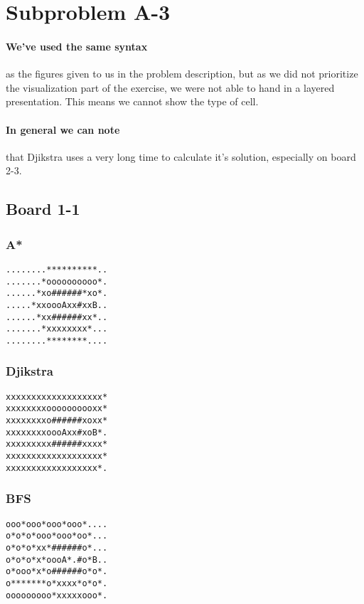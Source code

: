 \documentclass[11pt,a4paper]{article}
\begin{document}
\section*{Subproblem A-3}
\paragraph{We've used the same syntax} as the figures given to us in the problem description, but as we did not prioritize the visualization part of the exercise, we were not able to hand in a layered presentation. This means we cannot show the type of cell.

\paragraph{In general we can note} that Djikstra uses a very long time to calculate it's solution, especially on board 2-3.

\subsection*{Board 1-1}
\subsubsection*{A*}
\begin{lstlisting}
........**********..
.......*oooooooooo*.
......*xo######*xo*.
.....*xxoooAxx#xxB..
......*xx######xx*..
.......*xxxxxxxx*...
........********....
\end{lstlisting}

\subsubsection*{Djikstra}
\begin{lstlisting}
xxxxxxxxxxxxxxxxxxx*
xxxxxxxxoooooooooxx*
xxxxxxxxo######xoxx*
xxxxxxxxoooAxx#xoB*.
xxxxxxxxx######xxxx*
xxxxxxxxxxxxxxxxxxx*
xxxxxxxxxxxxxxxxxx*.
\end{lstlisting}



\subsubsection*{BFS}
\begin{lstlisting}
ooo*ooo*ooo*ooo*....
o*o*o*ooo*ooo*oo*...
o*o*o*xx*######o*...
o*o*o*x*oooA*.#o*B..
o*ooo*x*o######o*o*.
o*******o*xxxx*o*o*.
ooooooooo*xxxxxooo*.
\end{lstlisting}
\end{document}
